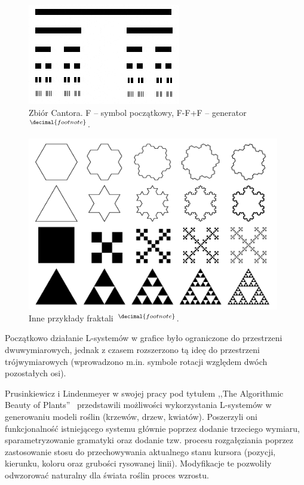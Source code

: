 \addtocounter{footnote}{1}
\begin{figure}[h!]
  \centering
  \includegraphics{images/fractal.png}
  \caption[Zbiór Cantora. F -- symbol początkowy, F-F+F --
  generator]{Zbiór Cantora. F -- symbol początkowy, F-F+F --
  generator~$^{\decimal{footnote}}$.}
  \label{fractal01}
\end{figure}
\addtocounter{footnote}{1}
\begin{figure}[h!]
  \centering
  \includegraphics[width=11cm]{images/fractals.png}
  \caption[Inne przykłady fraktali]{Inne przykłady
  fraktali~$^{\decimal{footnote}}$.}
  \label{fractal02}
\end{figure}

Początkowo działanie L-systemów w grafice było ograniczone do przestrzeni
dwuwymiarowych, jednak z czasem rozszerzono tą ideę do przestrzeni
trójwymiarowych (wprowadzono m.in. symbole rotacji względem dwóch pozostałych
osi).

Prusinkiewicz i Lindenmeyer w swojej pracy pod tytułem ,,The Algorithmic Beauty
of Plants''~\cite{abop} przedstawili możliwości wykorzystania L-systemów w
generowaniu modeli roślin (krzewów, drzew, kwiatów). Poszerzyli oni
funkcjonalność istniejącego systemu głównie poprzez dodanie trzeciego wymiaru,
sparametryzowanie gramatyki oraz dodanie tzw. procesu rozgałęziania poprzez
zastosowanie stosu do przechowywania aktualnego stanu kursora (pozycji,
kierunku, koloru oraz grubości rysowanej linii). Modyfikacje te pozwoliły
odwzorować naturalny dla świata roślin proces wzrostu.

